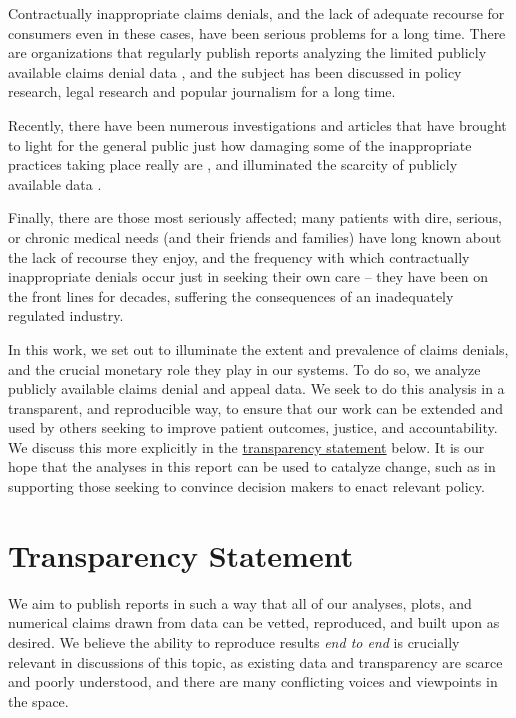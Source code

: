 \documentclass[12pt, a4paper,twoside,parskip=full]{report}
\theoremstyle{plain} %
\theoremstyle{definition} %
\theoremstyle{remark} %
\numberwithin{equation}{chapter}
\begin{document}
		
		Contractually inappropriate claims denials, and the lack of
		adequate recourse for consumers even in these cases, have been serious problems for a long time. There are organizations that regularly publish reports  analyzing the limited publicly available claims denial data \cite{pollitz2021}, and the subject has been discussed in policy research, legal research \cite{fox2022} and popular journalism \cite{konrad2010} for a long time.
		
		Recently, there have been numerous investigations and articles that have brought to light for the general public just how damaging some of the inappropriate practices taking place really are \cite{armstrong2023a} \cite{armstrong2023b}, and illuminated the scarcity of publicly available data \cite{fields2023}.
		
		Finally, there are those most seriously affected; many patients with dire, serious, or chronic medical needs (and their friends and families) have long known about the lack of recourse they enjoy, and the frequency with which contractually inappropriate denials occur just in seeking their own care -- they have been on the front lines for decades, suffering the consequences of an inadequately regulated industry.
		
		In this work, we set out to illuminate the extent and prevalence of claims denials,
		and the crucial monetary role they play in our systems. To do so, we analyze publicly
		available claims denial and appeal data. We seek to do this analysis in a transparent,
		and reproducible way, to ensure that our work can be extended and used by others
		seeking to improve patient outcomes, justice, and accountability. We discuss this more
		explicitly in the \hyperref[reproducibilitystatement]{transparency statement} below. It is our hope
		that the analyses in this report can be used to catalyze change, such as in supporting those
		seeking to convince decision makers to enact relevant policy.
		
		\chapter{Transparency Statement}\label{reproducibilitystatement}
		
		We aim to publish reports in such a way that all of our analyses, plots,
		and numerical claims drawn from data can be vetted, reproduced, and built upon as desired.
		We believe the ability to reproduce results \emph{end to end} is crucially relevant in discussions
		of this topic, as existing data and transparency are scarce and poorly understood, and there are
		many conflicting voices and viewpoints in the space.
		
\end{document}
